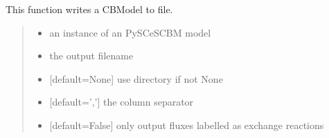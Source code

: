 \documentclass[letterpaper,12pt,english]{sphinxmanual}
\begin{document}
\begin{fulllineitems}

\pysigstartsignatures
\pysiglinewithargsret
{}
{\sphinxparamcomma {}\sphinxparamcomma {}\sphinxparamcomma {}\sphinxparamcomma {}}
{}
\pysigstopsignatures
\sphinxAtStartPar
This function writes a CBModel to file.
\begin{quote}\begin{description}
\begin{itemize}
\item {} 
\sphinxAtStartPar
{} \textendash{} an instance of an PySCeSCBM model

\item {} 
\sphinxAtStartPar
{} \textendash{} the output filename

\item {} 
\sphinxAtStartPar
{} \textendash{} {[}default=None{]} use directory if not None

\item {} 
\sphinxAtStartPar
{} \textendash{} {[}default=’,’{]} the column separator

\item {} 
\sphinxAtStartPar
{} \textendash{} {[}default=False{]} only output fluxes labelled as exchange reactions

\end{itemize}

\end{description}\end{quote}

\end{fulllineitems}
\end{document}
